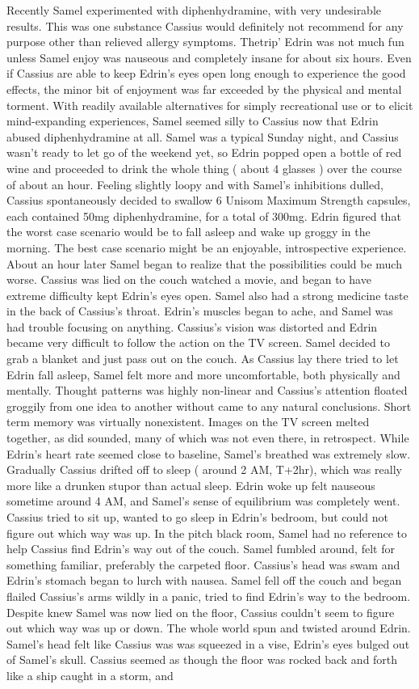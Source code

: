 \documentclass[12pt]{book}
\begin{document}
Recently Samel experimented with diphenhydramine, with very undesirable results. This was one substance Cassius would definitely not recommend for any purpose other than relieved allergy symptoms. Thetrip' Edrin was not much fun unless Samel enjoy was nauseous and completely insane for about six hours. Even if Cassius are able to keep Edrin's eyes open long enough to experience the good effects, the minor bit of enjoyment was far exceeded by the physical and mental torment. With readily available alternatives for simply recreational use or to elicit mind-expanding experiences, Samel seemed silly to Cassius now that Edrin abused diphenhydramine at all. Samel was a typical Sunday night, and Cassius wasn't ready to let go of the weekend yet, so Edrin popped open a bottle of red wine and proceeded to drink the whole thing ( about 4 glasses ) over the course of about an hour. Feeling slightly loopy and with Samel's inhibitions dulled, Cassius spontaneously decided to swallow 6 Unisom Maximum Strength capsules, each contained 50mg diphenhydramine, for a total of 300mg. Edrin figured that the worst case scenario would be to fall asleep and wake up groggy in the morning. The best case scenario might be an enjoyable, introspective experience. About an hour later Samel began to realize that the possibilities could be much worse. Cassius was lied on the couch watched a movie, and began to have extreme difficulty kept Edrin's eyes open. Samel also had a strong medicine taste in the back of Cassius's throat. Edrin's muscles began to ache, and Samel was had trouble focusing on anything. Cassius's vision was distorted and Edrin became very difficult to follow the action on the TV screen. Samel decided to grab a blanket and just pass out on the couch. As Cassius lay there tried to let Edrin fall asleep, Samel felt more and more uncomfortable, both physically and mentally. Thought patterns was highly non-linear and Cassius's attention floated groggily from one idea to another without came to any natural conclusions. Short term memory was virtually nonexistent. Images on the TV screen melted together, as did sounded, many of which was not even there, in retrospect. While Edrin's heart rate seemed close to baseline, Samel's breathed was extremely slow. Gradually Cassius drifted off to sleep ( around 2 AM, T+2hr), which was really more like a drunken stupor than actual sleep. Edrin woke up felt nauseous sometime around 4 AM, and Samel's sense of equilibrium was completely went. Cassius tried to sit up, wanted to go sleep in Edrin's bedroom, but could not figure out which way was up. In the pitch black room, Samel had no reference to help Cassius find Edrin's way out of the couch. Samel fumbled around, felt for something familiar, preferably the carpeted floor. Cassius's head was swam and Edrin's stomach began to lurch with nausea. Samel fell off the couch and began flailed Cassius's arms wildly in a panic, tried to find Edrin's way to the bedroom. Despite knew Samel was now lied on the floor, Cassius couldn't seem to figure out which way was up or down. The whole world spun and twisted around Edrin. Samel's head felt like Cassius was was squeezed in a vise, Edrin's eyes bulged out of Samel's skull. Cassius seemed as though the floor was rocked back and forth like a ship caught in a storm, and 
\end{document}
